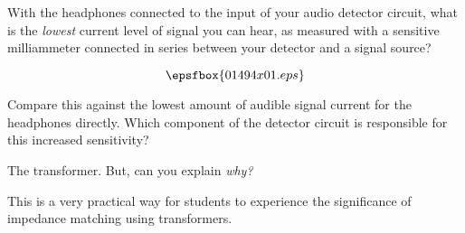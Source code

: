 

With the headphones connected to the input of your audio detector circuit, what is the {\it lowest} current level of signal you can hear, as measured with a sensitive milliammeter connected in series between your detector and a signal source?

$$\epsfbox{01494x01.eps}$$

Compare this against the lowest amount of audible signal current for the headphones directly.  Which component of the detector circuit is responsible for this increased sensitivity?







The transformer.  But, can you explain {\it why?}







This is a very practical way for students to experience the significance of impedance matching using transformers.



